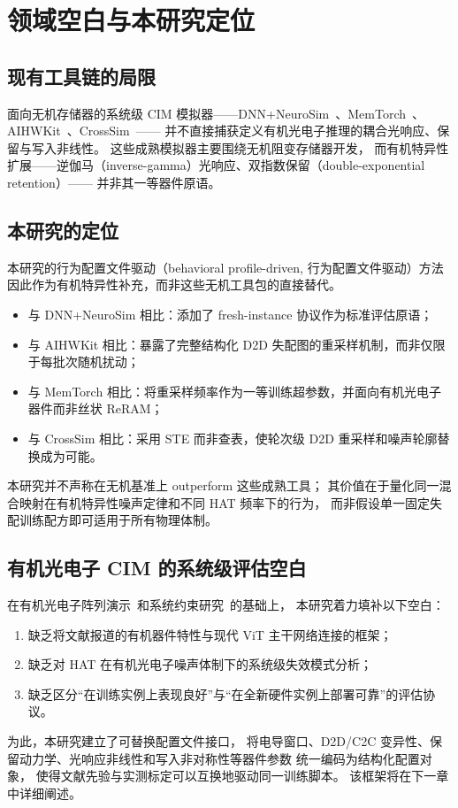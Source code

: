 \section{领域空白与本研究定位}

\subsection{现有工具链的局限}

面向无机存储器的系统级 CIM 模拟器——DNN+NeuroSim~\citep{peng2020dnnneurosim}、MemTorch~\citep{lammie2022memtorch}、AIHWKit~\citep{rasch2021aihwkit}、CrossSim~\citep{crosssim2024}——
并不直接捕获定义有机光电子推理的耦合光响应、保留与写入非线性。
这些成熟模拟器主要围绕无机阻变存储器开发，
而有机特异性扩展——逆伽马（inverse-gamma）光响应、双指数保留（double-exponential retention）——
并非其一等器件原语。

\subsection{本研究的定位}

本研究的行为配置文件驱动（behavioral profile-driven, 行为配置文件驱动）方法因此作为有机特异性补充，而非这些无机工具包的直接替代。
\begin{itemize}
    \item 与 DNN+NeuroSim 相比：添加了 fresh-instance 协议作为标准评估原语；
    \item 与 AIHWKit 相比：暴露了完整结构化 D2D 失配图的重采样机制，而非仅限于每批次随机扰动；
    \item 与 MemTorch 相比：将重采样频率作为一等训练超参数，并面向有机光电子器件而非丝状 ReRAM；
    \item 与 CrossSim 相比：采用 STE 而非查表，使轮次级 D2D 重采样和噪声轮廓替换成为可能。
\end{itemize}

本研究并不声称在无机基准上 outperform 这些成熟工具；
其价值在于量化同一混合映射在有机特异性噪声定律和不同 HAT 频率下的行为，
而非假设单一固定失配训练配方即可适用于所有物理体制。

\subsection{有机光电子 CIM 的系统级评估空白}

在有机光电子阵列演示~\citep{gebregiorgis2023organiccim,zhang2025opect,zhang2025mooptoelectronic,cui2025multimode}和系统约束研究~\citep{visionarch2023crosstalk,amspa2024insensor,jang2023insensor,fuller2020tempresilient,guo2024hightemp}的基础上，
本研究着力填补以下空白：
\begin{enumerate}
    \item 缺乏将文献报道的有机器件特性与现代 ViT 主干网络连接的框架；
    \item 缺乏对 HAT 在有机光电子噪声体制下的系统级失效模式分析；
    \item 缺乏区分``在训练实例上表现良好''与``在全新硬件实例上部署可靠''的评估协议。
\end{enumerate}

为此，本研究建立了可替换配置文件接口，
将电导窗口、D2D/C2C 变异性、保留动力学、光响应非线性和写入非对称性等器件参数
统一编码为结构化配置对象，
使得文献先验与实测标定可以互换地驱动同一训练脚本。
该框架将在下一章中详细阐述。
